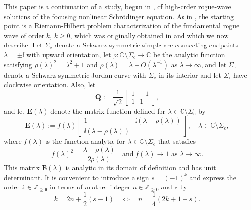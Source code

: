 This paper is a continuation of a study, begun in \cite{BilmanLM20}, of high-order rogue-wave solutions of the focusing nonlinear Schr\"odinger equation.  As in \cite{BilmanLM20}, the starting point is a Riemann-Hilbert problem characterization of the fundamental rogue wave of order $k$, $k\geq 0$, which was originally obtained in \cite{BilmanM19} and which we now describe. Let $\Sigma_\mathrm{c}$ denote a Schwarz-symmetric simple arc connecting endpoints $\lambda=\pm\ii$ with upward orientation, let $\rho:\mathbb{C}\setminus\Sigma_\mathrm{c}\to\mathbb{C}$ be the analytic function satisfying $\rho(\lambda)^2=\lambda^2+1$ and $\rho(\lambda)=\lambda+O(\lambda^{-1})$ as $\lambda\to\infty$, and let $\Sigma_\circ$ denote a Schwarz-symmetric Jordan curve with $\Sigma_\mathrm{c}$ in its interior and let $\Sigma_\circ$ have clockwise orientation.  
Also, let
\begin{equation}
\mathbf{Q}:=\frac{1}{\sqrt{2}}\begin{bmatrix} 1 & -1 \\ 1 & 1\end{bmatrix},
\label{eq:Q-def}
\end{equation}
and let $\mathbf{E}(\lambda)$ denote the matrix function defined for $\lambda\in\mathbb{C}\setminus\Sigma_\mathrm{c}$ by
\begin{equation}
\mathbf{E}(\lambda):= f(\lambda)\begin{bmatrix}1 & \ii (\lambda-\rho(\lambda))\\\ii(\lambda-\rho(\lambda)) & 1\end{bmatrix},\quad\lambda\in\mathbb{C}\setminus\Sigma_\mathrm{c},
\label{eq:E-def}
\end{equation}
where $f(\lambda)$ is the function analytic for $\lambda\in\mathbb{C}\setminus\Sigma_\mathrm{c}$ that satisfies 
\begin{equation}
f(\lambda)^2=\frac{\lambda+\rho(\lambda)}{2\rho(\lambda)}\quad\text{and $f(\lambda)\to 1$ as $\lambda\to\infty$.}
\label{eq:f-squared}
\end{equation}
This matrix $\mathbf{E}(\lambda)$ is analytic in its domain of definition and has unit determinant. 
It is convenient to introduce a sign $s=(-1)^k$ and express the order $k\in\mathbb{Z}_{\ge 0}$ in terms of another integer $n\in\mathbb{Z}_{\ge 0}$ and $s$ by
\begin{equation}
k=2n+\frac{1}{2}(s-1)\quad\Longleftrightarrow\quad n=\frac{1}{4}(2k+1-s).
\label{eq:k-vs-n}
\end{equation}
